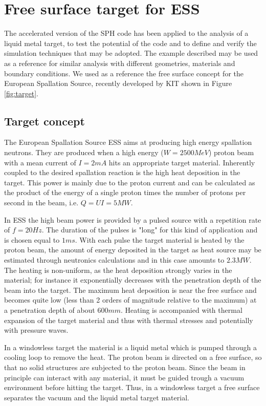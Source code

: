 \documentclass[a4paper, 11pt, twocolumn]{article}
\begin{document}
\section{Free surface target for ESS}
The accelerated version of the SPH code has been applied to the analysis of a liquid metal target, to test the potential of the code and to define and verify the simulation techniques that may be adopted. The example described may be used as a reference for similar analysis with different geometries, materials and boundary conditions. We used as a reference the free surface concept for the European Spallation Source, recently developed by KIT shown in Figure \ref{fig:target}.

\subsection{Target concept}
The European Spallation Source ESS aims at producing high energy spallation neutrons. They are produced when a high energy ($W=2500MeV$) proton beam with a mean current of $I=2 mA$ hits an appropriate target material. Inherently coupled to the desired spallation reaction is the high heat deposition in the target. This power is mainly due to the proton current and can be calculated as the product of the energy of a single proton times the number of protons per second in the beam, i.e. $Q = UI = 5 MW$. 

In ESS the high beam power is provided by a pulsed source with a repetition rate of $f=20 Hz$. The duration of the pulses is "long" for this kind of application and is chosen equal to $1ms$.
With each pulse the target material is heated by the proton beam, the amount of energy deposited in the target as heat source may be estimated through neutronics calculations and in this case amounts to $2.3MW$. The heating is non-uniform, as the heat deposition strongly varies in the material; for instance it exponentially decreases with the penetration depth of the beam into the target. The maximum heat deposition is near the free surface and becomes quite low (less than 2 orders of magnitude relative to the maximum) at a penetration depth of about $600 mm$. Heating is accompanied with thermal expansion of the target material and thus with thermal stresses and potentially with pressure waves.

In a windowless target the material is a liquid metal which is pumped through a cooling loop to remove the heat. The proton beam is directed on a free surface, so that no solid structures are subjected to the proton beam. Since the beam in principle can interact with any material, it must be guided trough a vacuum environment before hitting the target. Thus, in a windowless target a free surface separates the vacuum and the liquid metal target material.
\end{document}
